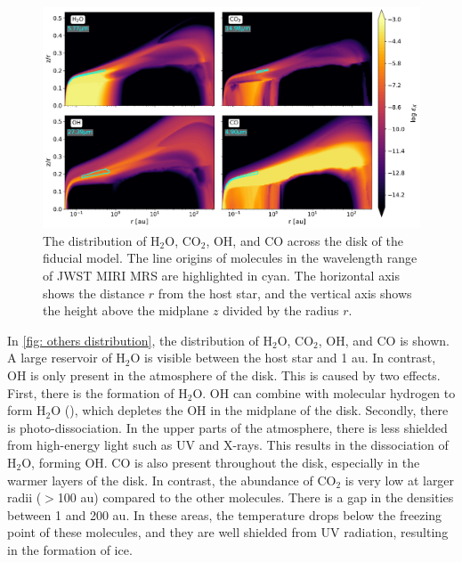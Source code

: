 \documentclass[oneside, single, authoryear, semicolon, 12pt]{lion-msc}
\newcommand{\4}{$_4$}
\newcommand{\3}{$_3$}
\newcommand{\2}{$_2$}
\begin{document}
\begin{figure}[H]
    \centering
    \includegraphics[width=\linewidth]{Figures/Abundance1.pdf}
    \caption{The distribution of H\2O, CO\2, OH, and CO across the disk of the fiducial model. The line origins of molecules in the wavelength range of JWST MIRI MRS are highlighted in cyan. The horizontal axis shows the distance $r$ from the host star, and the vertical axis shows the height above the midplane $z$ divided by the radius $r$.}
    \label{fig: others distribution}
\end{figure}

In \autoref{fig: others distribution}, the distribution of H\2O, CO\2, OH, and CO is shown. A large reservoir of H\2O is visible between the host star and 1 au. In contrast, OH is only present in the atmosphere of the disk. This is caused by two effects. First, there is the formation of H\2O. OH can combine with molecular hydrogen to form H\2O (), which depletes the OH in the midplane of the disk. Secondly, there is photo-dissociation. In the upper parts of the atmosphere, there is less shielded from high-energy light such as UV and X-rays. This results in the dissociation of H\2O, forming OH. CO is also present throughout the disk, especially in the warmer layers of the disk. In contrast, the abundance of CO\2 is very low at larger radii ($>$100 au) 
compared to the other molecules. There is a gap in the densities between 1 and 200 au. In these areas, the temperature drops below the freezing point of these molecules, and they are well shielded from UV radiation, resulting in the formation of ice. 
\end{document}
